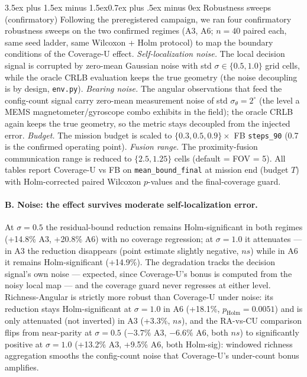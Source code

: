 \documentclass[journal]{IEEEtran}
\makeatletter
\newcommand{\CU}{Coverage-U}
\newcommand{\RA}{Richness-Angular}
\renewcommand{\subsection}{\@startsection{subsection}{2}{\z@}%
{3.5ex plus 1.5ex minus 1.5ex}{0.7ex plus .5ex minus 0ex}%
{\normalfont\normalsize\bfseries}}
\makeatother
\begin{document}
\subsection{Robustness sweeps (confirmatory)}
Following the preregistered campaign, we ran four confirmatory robustness
sweeps on the two confirmed regimes (A3, A6; $n = 40$ paired each, same seed
ladder, same
Wilcoxon + Holm protocol) to map the boundary conditions of the \CU{} effect.
\emph{Self-localization noise.} The local decision signal is corrupted by
zero-mean Gaussian noise with std $\sigma \in \{0.5, 1.0\}$ grid cells, while
the oracle CRLB evaluation keeps the true geometry (the noise decoupling is by
design, \texttt{env.py}). \emph{Bearing noise.} The angular observations that
feed the config-count signal carry zero-mean measurement noise of std
$\sigma_\theta = 2^\circ$ (the level a MEMS magnetometer/gyroscope combo
exhibits in the field); the oracle CRLB again keeps the true geometry, so the
metric stays decoupled from the injected error. \emph{Budget.} The mission
budget is scaled to $\{0.3, 0.5, 0.9\} \times$ FB \texttt{steps\_90} (0.7 is
the confirmed operating point). \emph{Fusion range.} The proximity-fusion
communication range is reduced to $\{2.5, 1.25\}$ cells (default =
FOV = 5). All tables report \CU{} vs FB on \texttt{mean\_bound\_final} at
mission end (budget $T$) with Holm-corrected paired Wilcoxon $p$-values and the
final-coverage guard.

\paragraph{B. Noise: the effect survives moderate self-localization error.}
At $\sigma = 0.5$ the residual-bound reduction remains Holm-significant in both
regimes (+14.8\% A3, +20.8\% A6) with no coverage regression; at $\sigma = 1.0$
it attenuates --- in A3 the reduction disappears (point estimate slightly
negative, $ns$) while in A6 it remains Holm-significant (+14.9\%). The
degradation tracks the decision signal's own noise --- expected, since
\CU's{} bonus is computed from the noisy local map --- and the coverage guard
never regresses at either level. \RA{} is strictly more robust than \CU{}
under noise: its reduction stays Holm-significant at $\sigma = 1.0$ in A6
(+18.1\%, $p_{\text{Holm}} = 0.0051$) and is only attenuated (not inverted) in
A3 (+3.3\%, $ns$), and the RA-vs-CU comparison flips from near-parity at
$\sigma = 0.5$ ($-3.7\%$ A3, $-6.6\%$ A6, both $ns$) to significantly positive
at $\sigma = 1.0$ (+13.2\% A3, +9.5\% A6, both Holm-sig): windowed richness
aggregation smooths the config-count noise that \CU's{} under-count bonus
amplifies.
\end{document}
